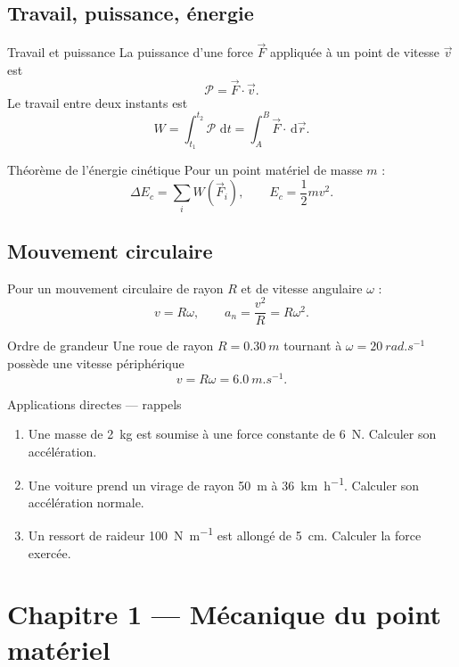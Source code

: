 \documentclass[11pt,a4paper]{article}
\newcommand{\dd}{\,\mathrm{d}}
\begin{document}
\subsection{Travail, puissance, énergie}

\begin{definitionbox}{Travail et puissance}{}
La puissance d'une force $\vec F$ appliquée à un point de vitesse $\vec v$ est
\[
\mathcal P=\vec F\cdot\vec v.
\]
Le travail entre deux instants est
\[
W=\int_{t_1}^{t_2}\mathcal P\,\dd t
=\int_{A}^{B}\vec F\cdot \dd \vec r.
\]
\end{definitionbox}

\begin{theoremBox}{Théorème de l'énergie cinétique}{}
Pour un point matériel de masse $m$ :
\[
\Delta E_c=\sum_i W(\vec F_i),
\qquad
E_c=\frac12 mv^2.
\]
\end{theoremBox}

\subsection{Mouvement circulaire}

Pour un mouvement circulaire de rayon $R$ et de vitesse angulaire $\omega$ :
\[
v=R\omega,
\qquad
a_n=\frac{v^2}{R}=R\omega^2.
\]

\begin{examplebox}{Ordre de grandeur}{}
Une roue de rayon $R=\SI{0.30}{m}$ tournant à $\omega=\SI{20}{rad.s^{-1}}$ possède une vitesse périphérique
\[
v=R\omega=\SI{6.0}{m.s^{-1}}.
\]
\end{examplebox}

\begin{exercisebox}{Applications directes — rappels}{}
\begin{enumerate}
  \item Une masse de \SI{2}{kg} est soumise à une force constante de \SI{6}{N}. Calculer son accélération.
  \item Une voiture prend un virage de rayon \SI{50}{m} à \SI{36}{km.h^{-1}}. Calculer son accélération normale.
  \item Un ressort de raideur \SI{100}{N.m^{-1}} est allongé de \SI{5}{cm}. Calculer la force exercée.
\end{enumerate}
\end{exercisebox}

\section{Chapitre 1 — Mécanique du point matériel}
\end{document}
